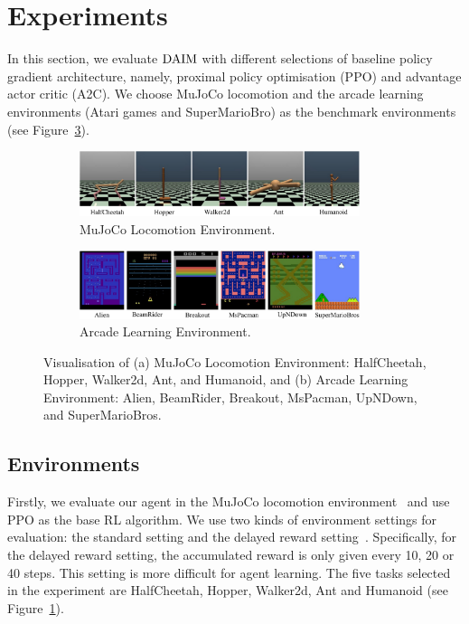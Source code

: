\section{Experiments}
In this section, we evaluate $\text{DAIM}$ with different selections of baseline policy gradient architecture, namely, proximal policy optimisation (PPO) and advantage actor critic (A2C). We choose MuJoCo locomotion and the arcade learning environments (Atari games and SuperMarioBro) as the benchmark environments (see Figure~\ref{fig:ch5_envs}).
\begin{figure}[h]
    \begin{subfigure}{\textwidth}
        \centering
        \includegraphics[width=0.9\textwidth]{figures/chapter5/mujoco_env.pdf}
        \caption{MuJoCo Locomotion Environment.}
        \label{fig:mujoco_env}
    \end{subfigure}
    \begin{subfigure}{\textwidth}
        \centering
        \includegraphics[width=0.9\textwidth]{figures/chapter5/atari_env.pdf}
        \caption{Arcade Learning Environment.}
        \label{fig:ale_env}
    \end{subfigure}
    \caption[Evaluation environments of DAIM.]{Visualisation of (a) MuJoCo Locomotion Environment: HalfCheetah, Hopper, Walker2d, Ant, and Humanoid, and (b) Arcade Learning Environment: Alien, BeamRider, Breakout, MsPacman, UpNDown, and SuperMarioBros.}
    \label{fig:ch5_envs}
\end{figure}

\subsection{Environments}
Firstly, we evaluate our agent in the MuJoCo locomotion environment~\cite{duan2016benchmarking} and use PPO as the base RL algorithm. We use two kinds of environment settings for evaluation: the standard setting and the delayed reward setting~\cite{zheng2018learning}. Specifically, {for the delayed reward setting}, the accumulated reward is only given every 10, 20 or 40 steps. This setting is more difficult for agent learning. The five tasks selected in the experiment are HalfCheetah, Hopper, Walker2d, Ant and Humanoid (see Figure~\ref{fig:mujoco_env}).

